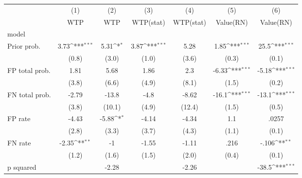 {
\def\sym#1{\ifmmode^{#1}\else\(^{#1}\)\fi}
\begin{tabular}{l*{6}{c}}
\hline\hline
                &\multicolumn{1}{c}{(1)}&\multicolumn{1}{c}{(2)}&\multicolumn{1}{c}{(3)}&\multicolumn{1}{c}{(4)}&\multicolumn{1}{c}{(5)}&\multicolumn{1}{c}{(6)}\\
                &\multicolumn{1}{c}{WTP}&\multicolumn{1}{c}{WTP}&\multicolumn{1}{c}{WTP(stat)}&\multicolumn{1}{c}{WTP(stat)}&\multicolumn{1}{c}{Value(RN)}&\multicolumn{1}{c}{Value(RN)}\\
\hline
model           &                  &                  &                  &                  &                  &                  \\
Prior prob.     &     3.73\sym{***}&     5.31\sym{*}  &     3.87\sym{***}&     5.28         &     1.85\sym{***}&     25.5\sym{***}\\
                &    (0.8)         &    (3.0)         &    (1.0)         &    (3.6)         &    (0.3)         &    (0.1)         \\
FP total prob.  &     1.81         &     5.68         &     1.86         &      2.3         &    -6.33\sym{***}&    -5.18\sym{***}\\
                &    (3.8)         &    (6.6)         &    (4.9)         &    (8.1)         &    (1.5)         &    (0.2)         \\
FN total prob.  &    -2.79         &    -13.8         &     -4.8         &    -8.62         &    -16.1\sym{***}&    -13.1\sym{***}\\
                &    (3.8)         &   (10.1)         &    (4.9)         &   (12.4)         &    (1.5)         &    (0.5)         \\
FP rate         &    -4.43         &    -5.88\sym{*}  &    -4.14         &    -4.34         &      1.1         &    .0257         \\
                &    (2.8)         &    (3.3)         &    (3.7)         &    (4.3)         &    (1.1)         &    (0.1)         \\
FN rate         &    -2.35\sym{**} &       -1         &    -1.55         &    -1.11         &     .216         &    -.106\sym{**} \\
                &    (1.2)         &    (1.6)         &    (1.5)         &    (2.0)         &    (0.4)         &    (0.1)         \\
p squared       &                  &    -2.28         &                  &    -2.26         &                  &    -38.5\sym{***}\\

\end{tabular}}
